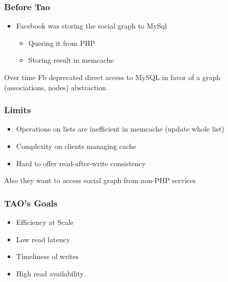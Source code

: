 \begin{frame}
\frametitle{Before Tao}
	\begin{itemize}
 	\item Facebook was storing the social graph to MySql
	\begin{itemize}
		\item  	Quering it from PHP
		\item  	Storing result in memcache\\
	\end{itemize}
	\end{itemize}
 	Over time Fb deprecated direct access to MySQL in favor of a graph (associations, nodes) abstraction
\end{frame}

\begin{frame}
\frametitle{Limits}
    \begin{itemize}
    	\item Operations on lists are inefficient in memcache (update whole list)
    	\item Complexity on clients managing cache
    	\item Hard to offer read-after-write consistency
    \end{itemize}
Also they want to access social graph from non-PHP services
\end{frame}

\begin{frame}
\frametitle{TAO's Goals}
	\begin{itemize}
		\item Efficiency at Scale
		\pause
		\item Low read latency
		\pause
		\item Timeliness of writes
		\pause
		\item High read availability
	\end{itemize}
\end{frame}
